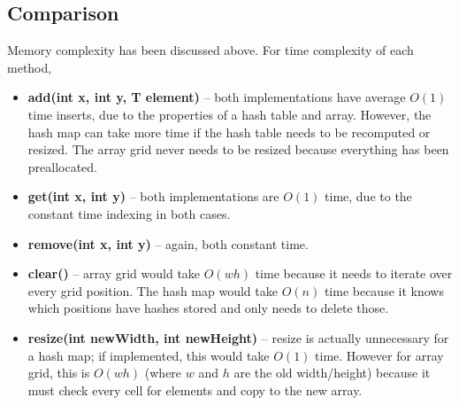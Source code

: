 \documentclass[11pt,a4paper]{article} %
\begin{document}
\subsection*{Comparison}
Memory complexity has been discussed above. For time complexity of 
each method, 
\begin{itemize}
    \item \textbf{add(int x, int y, T element)} -- both implementations 
    have average $O(1)$ time inserts, due to the properties of a hash table and 
    array. However, the hash map can take more time if the hash table needs 
    to be recomputed or resized. The array grid never needs to be resized because 
    everything has been preallocated.
    \item \textbf{get(int x, int y)} -- both implementations 
    are $O(1)$ time, due to the constant time indexing in both cases.
    \item \textbf{remove(int x, int y)} -- again, both constant time.
    \item \textbf{clear()} -- array grid would take $O(wh)$ time because 
    it needs to iterate over every grid position. The hash map would take 
    $O(n)$ time because it knows which positions have hashes stored
    and only needs to delete those.
    \item \textbf{resize(int newWidth, int newHeight)} -- resize is actually 
    unnecessary for a hash map; if implemented, this would take $O(1)$ time. However 
    for array grid, this is $O(wh)$ (where $w$ and $h$ are the old width/height) 
    because it must check every cell for 
    elements and copy to the new array.
\end{itemize}

 

\end{document}
